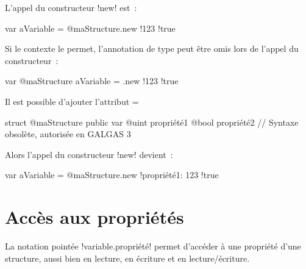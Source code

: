 L'appel du constructeur \ggst!new! est~:
\begin{galgas3}
var aVariable = @maStructure.new {!123 !true}
\end{galgas3}

Si le contexte le permet, l'annotation de type peut être omis lors de l'appel du constructeur~:
\begin{galgas3}
var @maStructure aVariable = .new {!123 !true}
\end{galgas3}

Il est possible d'ajouter l'attribut \ggst=%
\begin{galgas3}
struct @maStructure {
  public var @uint propriété1 %
  @bool propriété2 // Syntaxe obsolète, autorisée en GALGAS 3
}
\end{galgas3}

Alors l'appel du constructeur \ggst!new! devient~:
\begin{galgas3}
var aVariable = @maStructure.new {!propriété1: 123 !true}
\end{galgas3}


%


\section{Accès aux propriétés}

La notation pointée \ggst!variable.propriété! permet d'accéder à une propriété d'une structure, aussi bien en lecture, en écriture et en lecture/écriture.

